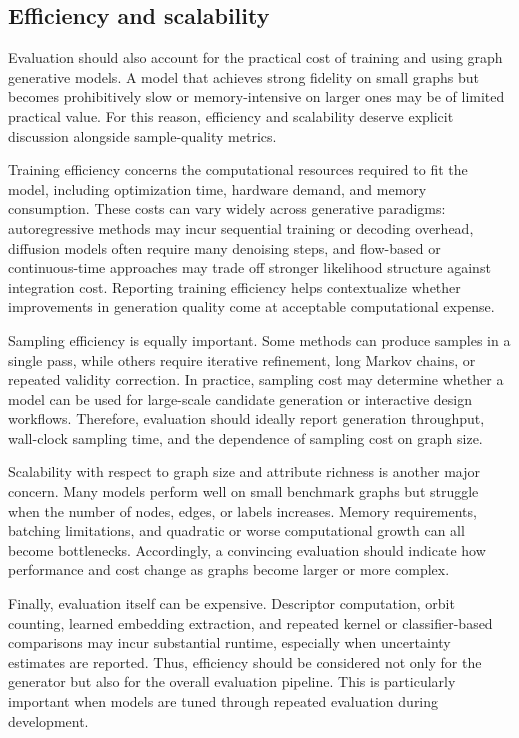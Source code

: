 \documentclass{article}
\begin{document}
\subsection{Efficiency and scalability}
\label{subsec:efficiency_scalability}

Evaluation should also account for the practical cost of training and using graph generative models. A model that achieves strong fidelity on small graphs but becomes prohibitively slow or memory-intensive on larger ones may be of limited practical value. For this reason, efficiency and scalability deserve explicit discussion alongside sample-quality metrics.

Training efficiency concerns the computational resources required to fit the model, including optimization time, hardware demand, and memory consumption. These costs can vary widely across generative paradigms: autoregressive methods may incur sequential training or decoding overhead, diffusion models often require many denoising steps, and flow-based or continuous-time approaches may trade off stronger likelihood structure against integration cost. Reporting training efficiency helps contextualize whether improvements in generation quality come at acceptable computational expense.

Sampling efficiency is equally important. Some methods can produce samples in a single pass, while others require iterative refinement, long Markov chains, or repeated validity correction. In practice, sampling cost may determine whether a model can be used for large-scale candidate generation or interactive design workflows. Therefore, evaluation should ideally report generation throughput, wall-clock sampling time, and the dependence of sampling cost on graph size.

Scalability with respect to graph size and attribute richness is another major concern. Many models perform well on small benchmark graphs but struggle when the number of nodes, edges, or labels increases. Memory requirements, batching limitations, and quadratic or worse computational growth can all become bottlenecks. Accordingly, a convincing evaluation should indicate how performance and cost change as graphs become larger or more complex.

Finally, evaluation itself can be expensive. Descriptor computation, orbit counting, learned embedding extraction, and repeated kernel or classifier-based comparisons may incur substantial runtime, especially when uncertainty estimates are reported. Thus, efficiency should be considered not only for the generator but also for the overall evaluation pipeline. This is particularly important when models are tuned through repeated evaluation during development.
\end{document}
